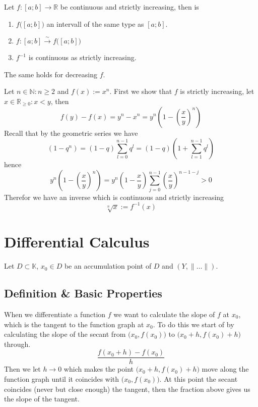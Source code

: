 \begin{theorem}
   Let \(f: [a;b] \to \mathbb{R}\) be continuous and strictly increasing, then is
   \begin{enumerate}[label=\roman*, align=Center]
      \item \(f\big([a;b]\big)\) an intervall of the same type as \([a;b]\).
      \item \(f:[a;b] \xrightarrow{\sim} f\big([a;b]\big)\)
      \item \(f^{-1}\) is continuous as strictly increasing.
   \end{enumerate}
\end{theorem}
\begin{remark}
   The same holds for decreasing \(f\).
\end{remark}
\begin{example}
   Let \(n \in \mathbb{N}: n \geq 2\) and \(f(x) := x^n\).
   First we show that \(f\) is strictly increasing, let \(x \in \mathbb{R}_{\geq 0}: x < y\), then
   \[f(y) - f(x) = y^n - x^n = y^n \left(1 - \left(\frac{x}{y}\right)^n\right)\]
   Recall that by the geometric series we have
   \[(1- q^n) = (1-q) \sum_{l=0}^{n-1} q^l = (1-q)\left(1 + \sum_{l=1}^{n-1} q^l\right)\]
   hence
   \[y^n \left(1 - \left(\frac{x}{y}\right)^n\right) = y^n \left(1 - \frac{x}{y}\right) \sum_{j=0}^{n-1} \left(\frac{x}{y}\right)^{n-1-j} > 0\]
   Therefor we have an inverse which is continuous and strictly increasing
   \[\sqrt[n]{x} := f^{-1}(x)\]
\end{example}

\newpage

\section{Differential Calculus}
Let \(D \subset \mathbb{K}\), \(x_0 \in D\) be an accumulation point of \(D\) and \((Y, \|\ldots\|)\).

\subsection{Definition \& Basic Properties}
When we differentiate a function \(f\) we want to calculate the slope of \(f\) at \(x_0\), which is the tangent to the function graph at \(x_0\).
To do this we start of by calculating the slope of the secant from \(\big(x_0, f(x_0)\big)\) to \(\big(x_0 + h, f(x_0) + h\big)\) through.
\[\frac{f(x_0 + h) - f(x_0)}{h}\]
Then we let \(h \to 0\) which makes the point \(\big(x_0 + h, f(x_0) + h\big)\) move along the function graph until it coincides with \(\big(x_0, f(x_0)\big)\).
At this point the secant coincides (never but close enough) the tangent, then the fraction above gives us the slope of the tangent.
\begin{center}
   
\end{center}

